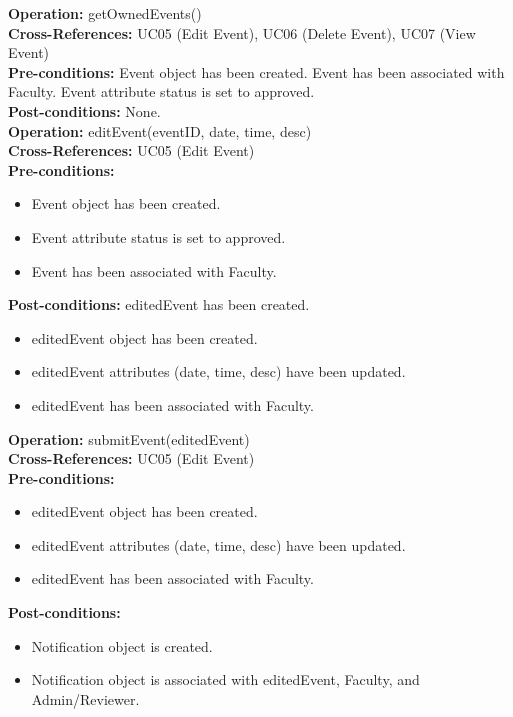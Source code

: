 \documentclass{article}
\begin{document}
\textbf{Operation:} getOwnedEvents() \\
\textbf{Cross-References:} UC05 (Edit Event), UC06 (Delete Event), UC07 (View Event) \\
\textbf{Pre-conditions:} Event object has been created. Event has been associated with Faculty. Event attribute status is set to approved. \\
\textbf{Post-conditions:} None. \\

\textbf{Operation:} editEvent(eventID, date, time, desc) \\
\textbf{Cross-References:} UC05 (Edit Event) \\
\textbf{Pre-conditions:}
\begin{itemize}
    \item Event object has been created.
    \item Event attribute status is set to approved.
    \item Event has been associated with Faculty.
\end{itemize}
\textbf{Post-conditions:} editedEvent has been created.
\begin{itemize}
    \item editedEvent object has been created.
    \item editedEvent attributes (date, time, desc) have been updated.
    \item editedEvent has been associated with Faculty.
\end{itemize}

\textbf{Operation:} submitEvent(editedEvent) \\
\textbf{Cross-References:} UC05 (Edit Event) \\
\textbf{Pre-conditions:}
\begin{itemize}
    \item editedEvent object has been created.
    \item editedEvent attributes (date, time, desc) have been updated.
    \item editedEvent has been associated with Faculty.
\end{itemize}
\textbf{Post-conditions:}
\begin{itemize}
    \item Notification object is created.
    \item Notification object is associated with editedEvent, Faculty, and Admin/Reviewer.
\end{itemize}
\end{document}
